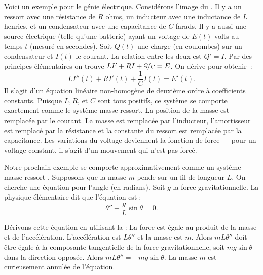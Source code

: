 \medskip

\begin{mywrapfigsimp}[5]{1.35in}{1.65in}
\noindent
{}
\end{mywrapfigsimp}
Voici un exemple pour le génie électrique. Considérons l'image du .
Il y a un ressort avec une résistance de $R$ ohms, un inducteur avec une inductance de $L$ henries,
et un condensateur avec une capacitance de $C$ farads.  Il y a aussi une source électrique (telle qu'une batterie) ayant un voltage de  $E(t)$ volts au temps $t$ (mesuré en secondes).
Soit $Q(t)$ une charge (en coulombes) sur un condensateur et $I(t)$ le courant.  La relation entre les deux est
$Q' = I$.  Par des principes élémentaires on trouve 
$L I' + RI + \nicefrac{Q}{C} = E$.  On dérive pour obtenir \,:   
\begin{equation*}
L I''(t) + R I'(t) + \frac{1}{C} I(t) = E'(t) .
\end{equation*}
Il s'agit d'un équation linéaire non-homogène de deuxième ordre à coefficients constants. 
Puisque $L, R$, et $C$ sont tous positifs, ce système se comporte exactement comme le système masse-ressort. La position de la masse est remplacée par le courant. La masse est remplacée par l'inducteur, l'amortisseur est remplacé par la résistance et la constante du ressort est remplacée par la capacitance. Les variations du voltage deviennent la fonction de force --- pour un voltage constant, il s'agit d'un mouvement qui n'est pas forcé. 

\medskip

\begin{mywrapfigsimp}[10]{1.8in}{2.16in}
\noindent
{}
\end{mywrapfigsimp}
Notre prochain exemple se comporte approximativement comme un système masse-ressort .  
Supposons que la masse $m$ pende sur un fil de longueur  $L$.  On cherche une équation pour l'angle (en radians). Soit $g$ la force gravitationnelle. La physique élémentaire dit que l'équation est\,: 
\begin{equation*}
\theta'' + \frac{g}{L} \sin \theta = 0 .
\end{equation*}

Dérivons cette équation en utilisant la :
La force est égale au produit de la masse et de l'accélération. L'accélération est
$L \theta''$ et la masse est $m$.  Alors $mL\theta''$ doit être égale à la composante tangentielle de la force gravitationnelle, soit 
$m g \sin \theta$ dans la direction opposée.
Alors $mL\theta'' = -mg \sin \theta$.
La masse $m$ est curieusement  annulée de l'équation. 

